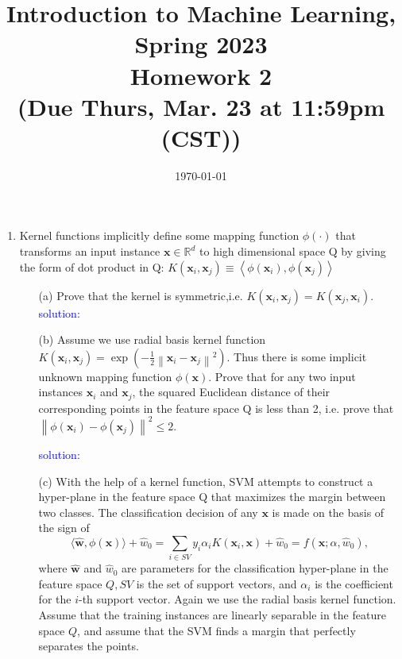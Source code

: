 \documentclass[10pt]{article}
\begin{document}
\date{\today}
\title{Introduction to Machine Learning, Spring 2023 \\
	Homework 2\\
	\small (Due Thurs, Mar. 23 at 11:59pm (CST))}
\maketitle
\begin{enumerate}[1.]


\item {}
Kernel functions implicitly define some mapping function  $\phi(\cdot)$  that transforms an input instance  $\mathbf{x} \in \mathbb{R}^{d}$  to high dimensional space  Q  by giving the form of dot product in  Q: $K\left(\mathbf{x}_{i}, \mathbf{x}_{j}\right) \equiv   \left\langle\phi\left(\mathbf{x}_{i}\right), \phi\left(\mathbf{x}_{j}\right)\right\rangle $
\begin{itemize}
    \item[(a)]  Prove that the kernel is symmetric,i.e. $K\left(\mathbf{x}_{i}, \mathbf{x}_{j}\right)=K\left(\mathbf{x}_{j}, \mathbf{x}_{i}\right).$
    \\
    \textcolor{blue}{solution: }
 \item[(b)] Assume we use radial basis kernel function  $K\left(\mathbf{x}_{i}, \mathbf{x}_{j}\right)=\exp \left(-\frac{1}{2}\left\|\mathbf{x}_{i}-\mathbf{x}_{j}\right\|^{2}\right)$. Thus there is some implicit unknown mapping function  $\phi(\mathbf{x}) $. Prove that for any two input instances  $\mathbf{x}_{i}$  and  $\mathbf{x}_{j}$, the squared Euclidean distance of their corresponding points in the feature space  Q  is less than 2, i.e. prove that  $\left\|\phi\left(\mathbf{x}_{i}\right)-\phi\left(\mathbf{x}_{j}\right)\right\|^{2} \leq 2$.

\textcolor{blue}{solution:}

\item[(c)] With the help of a kernel function, SVM attempts to construct a hyper-plane in the feature space  Q  that maximizes the margin between two classes. The classification decision of any  $\mathbf{x}$  is made on the basis of the sign of$$
\langle\hat{\mathbf{w}}, \phi(\mathbf{x})\rangle+\hat{w}_0=\sum_{i \in S V} y_i \alpha_i K\left(\mathbf{x}_i, \mathbf{x}\right)+\hat{w}_0=f\left(\mathbf{x} ; \alpha, \hat{w}_0\right),
$$
where $\hat{\mathbf{w}}$ and $\hat{w}_0$ are parameters for the classification hyper-plane in the feature space $Q, S V$ is the set of support vectors, and $\alpha_i$ is the coefficient for the $i$-th support vector. Again we use the radial basis kernel function. Assume that the training instances are linearly separable in the feature space $Q$, and assume that the SVM finds a margin that perfectly separates the points.


\end{itemize}
\end{enumerate}
\end{document}
